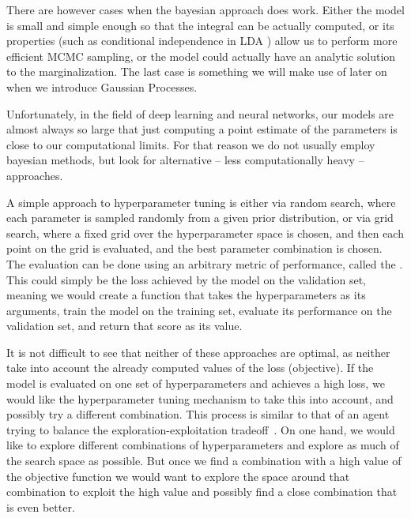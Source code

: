 There are however cases when the bayesian approach does work. Either the model
is small and simple enough so that the integral can be actually computed, or
its properties (such as conditional independence in LDA
\citep{lda-blei2003latent}) allow us to perform more efficient MCMC sampling,
or the model could actually have an analytic solution to the marginalization.
The last case is something we will make use of later on when we introduce
Gaussian Processes.

Unfortunately, in the field of deep learning \citep{dlbook} and neural
networks, our models are almost always so large that just computing a point
estimate of the parameters is close to our computational limits. For that
reason we do not usually employ bayesian methods, but look for alternative --
less computationally heavy -- approaches.

A simple approach to hyperparameter tuning is either via random search, where
each parameter is sampled randomly from a given prior distribution, or via grid
search, where a fixed grid over the hyperparameter space is chosen, and then
each point on the grid is evaluated, and the best parameter combination is
chosen. The evaluation can be done using an arbitrary metric of performance,
called the . This could simply be the loss
achieved by the model on the validation set, meaning we would create a function that takes the hyperparameters as its arguments, train the model on the training set, evaluate its performance on the validation set, and return that score as its value.

It is not difficult to see that neither of these approaches are optimal, as neither
take into account the already computed values of the loss (objective). If the model
is evaluated on one set of hyperparameters and achieves a high loss, we would
like the hyperparameter tuning mechanism to take this into account, and
possibly try a different combination. This process is similar to that of an
agent trying to balance the exploration-exploitation
tradeoff~\citep{russell2016artificial}.  On one hand, we would like to explore
different combinations of hyperparameters and explore as much of the search
space as possible.  But once we find a combination with a high value of the
objective function we would want to explore the space around that combination
to exploit the high value and possibly find a close combination that is even
better.

